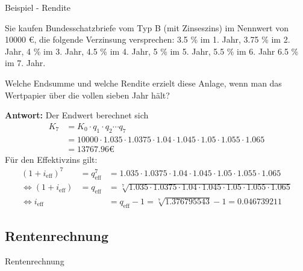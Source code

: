 \begin{frame}{Beispiel - Rendite}
{\small 	\begin{example}
		Sie kaufen Bundesschatzbriefe vom Typ B (mit Zinseszins) im Nennwert von 10000 €, die folgende Verzinsung versprechen: 3.5 \% im 1. Jahr, 3.75 \% im 2. Jahr, 4 \% im 3. Jahr, 4.5 \% im 4. Jahr, 5 \% im 5. Jahr, 5.5 \% im 6. Jahr 6.5 \% im 7. Jahr.
		
		Welche Endsumme und welche Rendite erzielt diese Anlage, wenn man das Wertpapier über die vollen sieben Jahr hält?
		
		\textbf{Antwort:} Der Endwert berechnet sich
		\begin{align*}
		K_{7} & = K_{0} \cdot q_{1} \cdot q_{2} \cdots q_{7} \\ 
		& = 10000 \cdot 1.035 \cdot 1.0375 \cdot 1.04 \cdot 1.045 \cdot 1.05 \cdot 1.055 \cdot 1.065 \\ 
		& = 13767.96 \text{€}  
		\end{align*}
		Für den Effektivzins gilt:
		\begin{align*}
		\left( 1+ i_{\text{eff}} \right)^{7} & = q_{\text{eff}}^{7} & = 1.035 \cdot 1.0375 \cdot 1.04 \cdot 1.045 \cdot 1.05 \cdot 1.055 \cdot 1.065 \\
		\Leftrightarrow \left( 1 + i_{\text{eff}} \right) & = q_{\text{eff}} & = \sqrt[7]{1.035 \cdot 1.0375 \cdot 1.04 \cdot 1.045 \cdot 1.05 \cdot 1.055 \cdot 1.065}  \\
		\Leftrightarrow i_{\text{eff}} & & = q_{\text{eff}} - 1  = \sqrt[7]{1.376795543} -1 = 0.046739211
		\end{align*}
	\end{example}
}\end{frame}

\subsection{Rentenrechnung}
\begin{frame}{Rentenrechnung}
	\begin{definition}
		
	\end{definition}
\end{frame}

